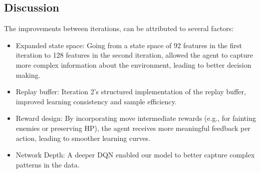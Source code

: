 \subsection{Discussion}
The improvements between iterations, can be attributed to several factors:
\begin{itemize}
    \item Expanded state space: Going from a state space of 92 features in the first iteration
          to 128 features in the second iteration, allowed the agent to capture more complex information
          about the environment, leading to better decision making.
    \item Replay buffer: Iteration 2's structured implementation of the replay buffer, improved
          learning consistency and sample efficiency.
    \item Reward design: By incorporating move intermediate rewards (e.g., for fainting enemies or preserving HP),
          the agent receives more meaningful feedback per action, leading to smoother learning curves.
    \item Network Depth: A deeper DQN enabled our model to better capture complex patterns in the data.
\end{itemize}